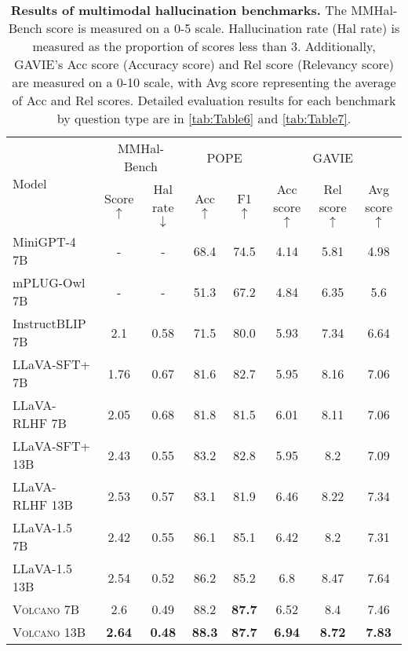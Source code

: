 \documentclass[11pt]{article}
\newcommand{\Ours}{\textsc{Volcano}}
\begin{document}
\begin{table*}[ht]
\centering
\small
\begin{tabular}{lcc|cc|ccc}
\toprule
\multirow{2}{*}{Model} & \multicolumn{2}{c|}{MMHal-Bench} & \multicolumn{2}{c|}{POPE} & \multicolumn{3}{c}{GAVIE} \\
& Score $\uparrow$ & Hal rate $\downarrow$ & Acc $\uparrow$ & F1 $\uparrow$ & Acc score $\uparrow$ & Rel score $\uparrow$ & Avg score $\uparrow$ \\
\midrule
MiniGPT-4 7B & - & - & 68.4 & 74.5 & 4.14 & 5.81 & 4.98 \\
mPLUG-Owl 7B & - & - & 51.3 & 67.2 & 4.84 & 6.35 & 5.6 \\
InstructBLIP 7B & 2.1 & 0.58 & 71.5 & 80.0 & 5.93 & 7.34 & 6.64 \\
LLaVA-SFT+ 7B & 1.76 & 0.67 & 81.6 & 82.7 & 5.95 & 8.16 & 7.06 \\
LLaVA-RLHF 7B & 2.05 & 0.68 & 81.8 & 81.5 & 6.01 & 8.11 & 7.06 \\
LLaVA-SFT+ 13B & 2.43 & 0.55 & 83.2 & 82.8 & 5.95 & 8.2 & 7.09 \\
LLaVA-RLHF 13B & 2.53 & 0.57 & 83.1 & 81.9 & 6.46 & 8.22 & 7.34 \\
\midrule
LLaVA-1.5 7B & 2.42 & 0.55 & 86.1 & 85.1 & 6.42 & 8.2 & 7.31 \\
LLaVA-1.5 13B & 2.54 & 0.52 & 86.2 & 85.2 & 6.8 & 8.47 & 7.64 \\
{\Ours} 7B & 2.6 & 0.49 & 88.2 & \textbf{87.7} & 6.52 & 8.4 & 7.46 \\
{\Ours} 13B & \textbf{2.64} & \textbf{0.48} & \textbf{88.3} & \textbf{87.7} & \textbf{6.94} & \textbf{8.72} & \textbf{7.83} \\
\bottomrule
\end{tabular}
\caption{\textbf{Results of multimodal hallucination benchmarks.}   The MMHal-Bench score is measured on a 0-5 scale. Hallucination rate (Hal rate) is measured as the proportion of scores less than 3. Additionally, GAVIE's Acc score (Accuracy score) and Rel score (Relevancy score) are measured on a 0-10 scale, with Avg score representing the average of Acc and Rel scores. Detailed evaluation results for each benchmark by question type are in \autoref{tab:Table6} and \autoref{tab:Table7}.}
\label{tab:Table1}
\end{table*}
\end{document}
